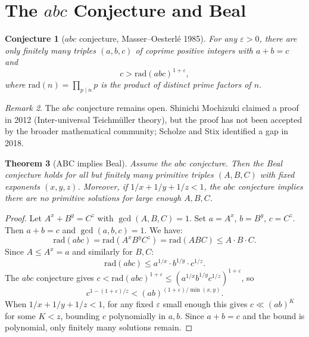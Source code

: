 \documentclass[12pt,a4paper]{amsart}
\newtheorem{theorem}{Theorem}[section]
\newtheorem{conjecture}[theorem]{Conjecture}
\theoremstyle{definition}
\theoremstyle{remark}
\newtheorem{remark}[theorem]{Remark}
\begin{document}
\section{The \texorpdfstring{$abc$}{abc} Conjecture and Beal}

\begin{conjecture}[$abc$ conjecture, Masser--Oesterlé 1985]\label{conj:abc}
For any $\varepsilon > 0$, there are only finitely many triples $(a,b,c)$ of
coprime positive integers with $a + b = c$ and
\[
  c > \mathrm{rad}(abc)^{1+\varepsilon},
\]
where $\mathrm{rad}(n) = \prod_{p \mid n} p$ is the product of distinct prime factors of $n$.
\end{conjecture}

\begin{remark}
The $abc$ conjecture remains open. Shinichi Mochizuki claimed a proof in 2012
(Inter-universal Teichmüller theory), but the proof has not been accepted by
the broader mathematical community; Scholze and Stix identified a gap in 2018.
\end{remark}

\begin{theorem}[ABC implies Beal]\label{thm:abcBeal}
Assume the $abc$ conjecture. Then the Beal conjecture holds for all but finitely
many primitive triples $(A, B, C)$ with fixed exponents $(x, y, z)$. Moreover,
if $1/x + 1/y + 1/z < 1$, the $abc$ conjecture implies there are no primitive
solutions for large enough $A, B, C$.
\end{theorem}

\begin{proof}
Let $A^x + B^y = C^z$ with $\gcd(A,B,C) = 1$. Set $a = A^x$, $b = B^y$, $c = C^z$.
Then $a + b = c$ and $\gcd(a,b,c) = 1$. We have:
\[
  \mathrm{rad}(abc) = \mathrm{rad}(A^x B^y C^z) = \mathrm{rad}(A B C)
  \leq A \cdot B \cdot C.
\]
Since $A \leq A^x = a$ and similarly for $B, C$:
\[
  \mathrm{rad}(abc) \leq a^{1/x} \cdot b^{1/y} \cdot c^{1/z}.
\]
The $abc$ conjecture gives $c < \mathrm{rad}(abc)^{1+\varepsilon} \leq
(a^{1/x} b^{1/y} c^{1/z})^{1+\varepsilon}$, so
\[
  c^{1 - (1+\varepsilon)/z} < (ab)^{(1+\varepsilon)/\min(x,y)}.
\]
When $1/x + 1/y + 1/z < 1$, for any fixed $\varepsilon$ small enough this gives
$c \ll (ab)^K$ for some $K < z$, bounding $c$ polynomially in $a,b$. Since
$a + b = c$ and the bound is polynomial, only finitely many solutions remain.
\end{proof}

\end{document}
